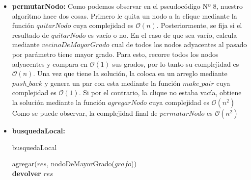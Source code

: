 \begin{itemize}
\item \textbf{permutarNodo:} \newline 
Como podemos observar en el pseudocódigo Nº 8, nuestro algoritmo hace dos cosas. Primero le quita un nodo a la clique mediante la función $quitarNodo$ cuya complejidad es $\mathcal{O}(n)$. Posteriormente, se fija si el resultado de $quitarNodo$ es vacío o no. \newline
En el caso de que sea vacío, calcula mediante $vecinoDeMayorGrado$ cual de todos los nodos adyacentes al pasado por parámetro tiene mayor grado. Para esto, recorre todos los nodos adyacentes y compara en $\mathcal{O}(1)$ sus grados, por lo tanto su complejidad es $\mathcal{O}(n)$. Una vez que tiene la solución, la coloca en un arreglo mediante $push\_back$ y genera un par con esta mediante la función $make\_pair$ cuya complejidad es $\mathcal{O}(1)$.
\newline
Si por el contrario, la clique no estaba vacía, obtiene la solución mediante la función $agregarNodo$ cuya complejidad es $\mathcal{O}(n^{2})$
\newline
Como se puede observar, la complejidad final de $permutarNodo$ es $\mathcal{O}(n^{2})$

\item \textbf{busquedaLocal:} \newline 

\begin{algorithm}[H]
    \SetAlgoLined
    \caption{busquedaLocal}
	
    agregar($res$, nodoDeMayorGrado($grafo$))\\
    	
    \textbf{devolver} $res$ \\
\end{algorithm}


\end{itemize}
